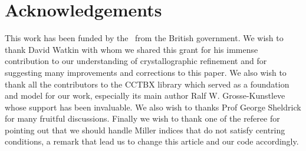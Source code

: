 \documentclass[11pt]{article}
\begin{document}
\section*{Acknowledgements}

This work has been funded by the \ourEPSRCgrant\ from the British government. We wish to thank David Watkin with whom we shared this grant for his immense contribution to our understanding of crystallographic refinement and for suggesting many improvements and corrections to this paper. We also wish to thank all the contributors to the CCTBX library which served as a foundation and model for our work, especially its main author Ralf W. Grosse-Kunstleve whose support has been invaluable. We also wish to thanks Prof George Sheldrick for many fruitful discussions. Finally we wish to thank one of the referee for pointing out that we should handle Miller indices that do not satisfy centring conditions, a remark that lead us to change this article and our code accordingly.


\end{document}
